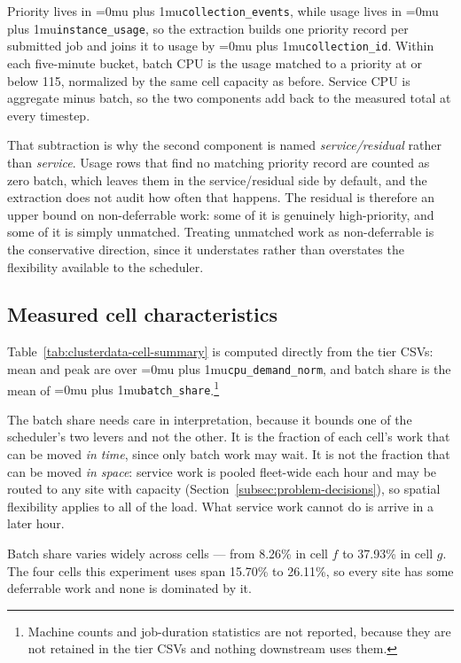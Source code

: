 ﻿\documentclass[12pt]{article}
\newcommand{\codepath}[1]{{\Urlmuskip=0mu plus 1mu\relax\nolinkurl{#1}}}
\begin{document}
Priority lives in \codepath{collection_events}, while usage lives in
\codepath{instance_usage}, so the extraction builds one priority record per
submitted job and joins it to usage by \codepath{collection_id}. Within each
five-minute bucket, batch CPU is the usage matched to a priority at or below
115, normalized by the same cell capacity as before. Service CPU is aggregate
minus batch, so the two components add back to the measured total at every
timestep.

That subtraction is why the second component is named \emph{service/residual}
rather than \emph{service}. Usage rows that find no matching priority record
are counted as zero batch, which leaves them in the service/residual side by
default, and the extraction does not audit how often that happens. The residual
is therefore an upper bound on non-deferrable work: some of it is genuinely
high-priority, and some of it is simply unmatched. Treating unmatched work as
non-deferrable is the conservative direction, since it understates rather than
overstates the flexibility available to the scheduler.

\subsection{Measured cell characteristics}
\label{subsec:clusterdata-cell-characteristics}

Table~\ref{tab:clusterdata-cell-summary} is computed directly from the tier
CSVs: mean and peak are over \codepath{cpu_demand_norm}, and batch share is the
mean of \codepath{batch_share}.\footnote{Machine counts and job-duration
statistics are not reported, because they are not retained in the tier CSVs and
nothing downstream uses them.}

The batch share needs care in interpretation, because it bounds one of the
scheduler's two levers and not the other. It is the fraction of each cell's work
that can be moved \emph{in time}, since only batch work may wait. It is not the
fraction that can be moved \emph{in space}: service work is pooled fleet-wide
each hour and may be routed to any site with capacity
(Section~\ref{subsec:problem-decisions}), so spatial flexibility applies to all
of the load. What service work cannot do is arrive in a later hour.

Batch share varies widely across cells --- from 8.26\% in cell \(f\) to 37.93\%
in cell \(g\). The four cells this experiment uses span 15.70\% to 26.11\%, so
every site has some deferrable work and none is dominated by it.
\end{document}
